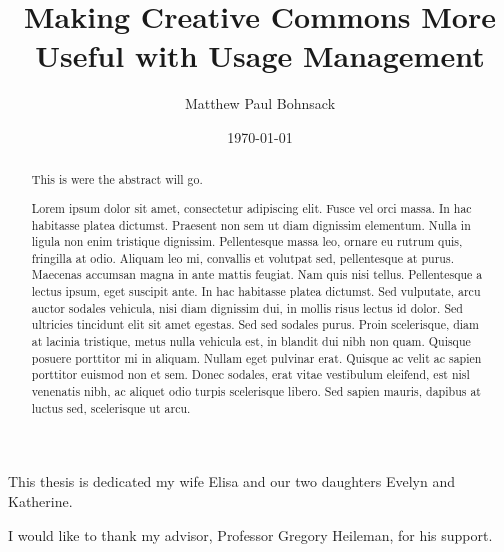 \documentclass[botnum,fleqn,final]{unmeethesis}
\newcommand{\mytitle}{Making Creative Commons More Useful with Usage Management}
\newcommand{\myauthor}{Matthew Paul Bohnsack}
\begin{document}
\frontmatter

\title{\mytitle}
\author{\myauthor}





\date{\today}

\maketitle

\makecopyright

\begin{dedication}
   This thesis is dedicated my wife Elisa and our two daughters Evelyn and Katherine.
\end{dedication}

\begin{acknowledgments}
   \vspace{1.1in}
   I would like to thank my advisor, Professor Gregory Heileman, for his support.
\end{acknowledgments}

\maketitleabstract

\begin{abstract}
This is were the abstract will go.

Lorem ipsum dolor sit amet, consectetur adipiscing elit. Fusce vel orci massa.
In hac habitasse platea dictumst. Praesent non sem ut diam dignissim elementum.
Nulla in ligula non enim tristique dignissim. Pellentesque massa leo, ornare eu
rutrum quis, fringilla at odio. Aliquam leo mi, convallis et volutpat sed,
pellentesque at purus. Maecenas accumsan magna in ante mattis feugiat. Nam quis
nisi tellus. Pellentesque a lectus ipsum, eget suscipit ante. In hac habitasse
platea dictumst. Sed vulputate, arcu auctor sodales vehicula, nisi diam
dignissim dui, in mollis risus lectus id dolor. Sed ultricies tincidunt elit
sit amet egestas. Sed sed sodales purus. Proin scelerisque, diam at lacinia
tristique, metus nulla vehicula est, in blandit dui nibh non quam. Quisque
posuere porttitor mi in aliquam. Nullam eget pulvinar erat. Quisque ac velit ac
sapien porttitor euismod non et sem. Donec sodales, erat vitae vestibulum
eleifend, est nisl venenatis nibh, ac aliquet odio turpis scelerisque libero.
Sed sapien mauris, dapibus at luctus sed, scelerisque ut arcu.

\clearpage %
\end{abstract}
\end{document}
